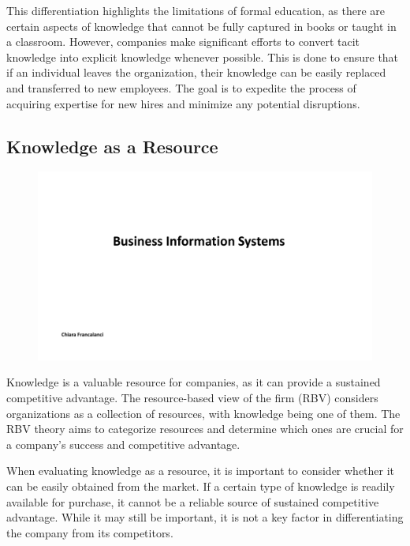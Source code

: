 This differentiation highlights the limitations of formal education, as
there are certain aspects of knowledge that cannot be fully captured in
books or taught in a classroom. However, companies make significant
efforts to convert tacit knowledge into explicit knowledge whenever
possible. This is done to ensure that if an individual leaves the
organization, their knowledge can be easily replaced and transferred to
new employees. The goal is to expedite the process of acquiring
expertise for new hires and minimize any potential disruptions.

\subsection{Knowledge as a Resource}\label{knowledge-as-a-resource}

\begin{figure}[!h]
    \centering
    \includegraphics[page=6, trim = 1.5cm 2.8cm 1.5cm 4cm, clip, width=\textwidth]{images/05 - KM.pdf}
\end{figure}

Knowledge is a valuable resource for companies, as it can provide a
sustained competitive advantage. The resource-based view of the firm
(RBV) considers organizations as a collection of resources, with
knowledge being one of them. The RBV theory aims to categorize resources
and determine which ones are crucial for a company's success and
competitive advantage.

When evaluating knowledge as a resource, it is important to consider
whether it can be easily obtained from the market. If a certain type of
knowledge is readily available for purchase, it cannot be a reliable
source of sustained competitive advantage. While it may still be
important, it is not a key factor in differentiating the company from
its competitors.

